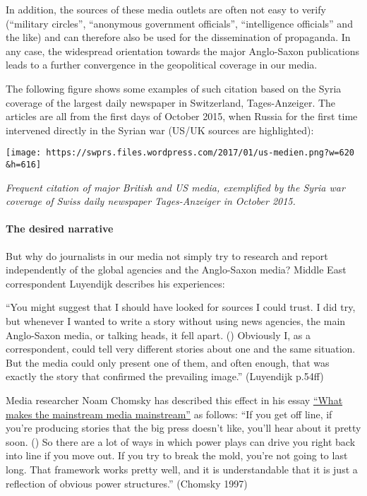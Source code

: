 In addition, the sources of these media outlets are often not easy to
verify (``military circles'', ``anonymous government officials'',
``intelligence officials'' and the like) and can therefore also be used
for the dissemination of propaganda. In any case, the widespread
orientation towards the major Anglo-Saxon publications leads to a
further convergence in the geopolitical coverage in our media.

The following figure shows some examples of such citation based on the
Syria coverage of the largest daily newspaper in Switzerland,
Tages-Anzeiger. The articles are all from the first days of October
2015, when Russia for the first time intervened directly in the Syrian
war (US/UK sources are highlighted):

\texttt{[image: https://swprs.files.wordpress.com/2017/01/us-medien.png?w=620\\\&h=616]}

\emph{Frequent citation of major British and US media, exemplified by
the Syria war coverage of Swiss daily newspaper Tages-Anzeiger in
October 2015.}

\hypertarget{the-desired-narrative}{%
\paragraph{The desired narrative}\label{the-desired-narrative}}

But why do journalists in our media not simply try to research and
report independently of the global agencies and the Anglo-Saxon media?
Middle East correspondent Luyendijk describes his experiences:

``You might suggest that I should have looked for sources I could trust.
I did try, but whenever I wanted to write a story without using news
agencies, the main Anglo-Saxon media, or talking heads, it fell apart.
() Obviously I, as a correspondent, could tell very different stories
about one and the same situation. But the media could only present one
of them, and often enough, that was exactly the story that confirmed the
prevailing image.'' (Luyendijk p.54ff)

Media researcher Noam Chomsky has described this effect in his essay
\href{https://chomsky.info/199710__/}{``What makes the mainstream media
mainstream''} as follows: ``If you get off line, if you're producing
stories that the big press doesn't like, you'll hear about it pretty
soon. () So there are a lot of ways in which power plays can drive you
right back into line if you move out. If you try to break the mold,
you're not going to last long. That framework works pretty well, and it
is understandable that it is just a reflection of obvious power
structures.'' (Chomsky 1997)

